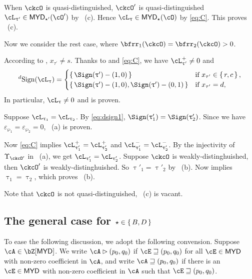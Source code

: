 \documentclass[12pt,a4paper]{amsart}
\def\MYD{{\mathsf{MYD}}}
\def\pac#1{\ac_{#1}^+}
\def\nac#1{\ac_{#1}^-}
\def\ac{\cL}
\numberwithin{equation}{section}
\theoremstyle{remark}
\def\dsign{{}^d\mathrm{Sign}}
\def\uptaup{\uptau^{\prime}}
\def\taup{\tau^{\prime}}
\begin{document}
\smallskip


When $\ckcO$ is quasi-distinguished, $\ckcO'$ is quasi-distinguished
$\ac_{\uptau'}\in \MYD_{\star'}(\cO')$ by
~(c). Hence $\ac_{\uptau}\in \MYD_{\star}(\cO)$ by \eqref{eq:C}. This
proves ~(c).


\medskip

Now we consider the rest case, where $\bfrr_{1}(\ckcO)=\bfrr_{2}(\ckcO)>0$.

According to ,  $x_{\taup}\neq s$.
Thanks to  and \eqref{eq:C}, we have $\pac{\uptaup} \neq 0$ and
\begin{equation}
\label{eq:dsign1}
  \dsign(\ac_{\uptau}) =
  \begin{cases}
    \set{ \Sign(\uptau') - (1,0)} & \text{if } x_{\taup} \in \set{r,c},\\
    \set{ \Sign(\uptau') - (1,0), \Sign(\uptau')-(0,1)} & \text{if
    } x_{\taup} = d, \\
  \end{cases}
\end{equation}
In particular,
$\ac_{\uptau}\neq 0$ and  is proven.


\smallskip


Suppose $\ac_{\uptau_{1}}=\ac_{\uptau_{2}}$. By \eqref{eq:dsign1},
$\Sign(\uptau'_{1})=\Sign(\uptau'_{2})$. Since we have
$\varepsilon_{\wp_{1}}=\varepsilon_{\wp_{2}}=0$, ~(a) is proven.


\smallskip

Now \eqref{eq:C} implies $\pac{\uptau'_{1}}=\pac{\uptau'_{2}}$ and
$\nac{\uptau'_{1}}=\nac{\uptau'_{2}}$.
By the injectivity of $\Upsilon_{\ckcO'}$ in ~(a), we get
$\ac_{\uptau'_{1}}=\ac_{\uptau'_{2}}$.
Suppose $\ckcO$ is weakly-distinghuished, then $\ckcO'$ is
weakly-distinghuished.
So $\uptau'_{1}=\uptau'_{2}$ by ~(b).
Now  implies $\uptau_{1}=\uptau_{2}$, which proves ~(b).


\smallskip

Note that $\ckcO$ is not quasi-distinguished, ~(c) is vacant.


\subsection{The general case for $\star\in \set{B,D}$}

To ease the following discussion, we adopt the following convension.
Suppose $\cA\in \bZ[\MYD]$. We write $\cA\rhd (p_{0},q_{0})$ if
$\cE \sqsupseteq (p_{0},q_{0})$ for all $\cE\in \MYD$ with non-zero coefficient in
$\cA$, and write $\cA \sqsupseteq (p_{0},q_{0})$ if there is an $\cE\in \MYD$ with
non-zero coefficient in $\cA$ such that $\cE\sqsupseteq (p_{0},q_{0})$.
\end{document}
